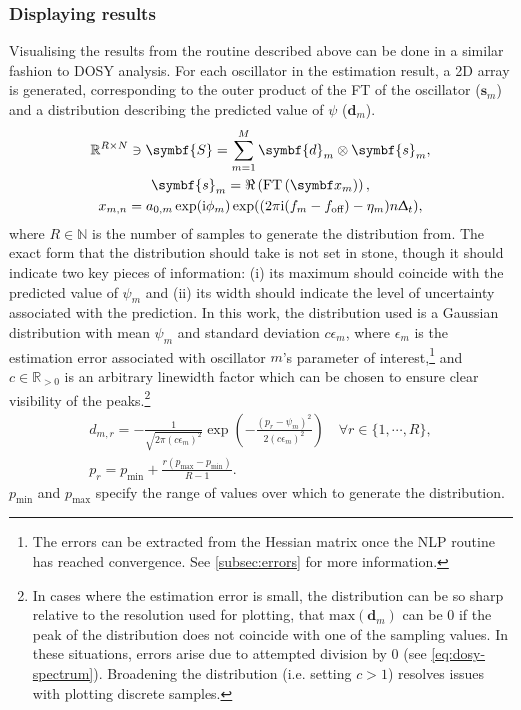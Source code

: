 \subsubsection{Displaying results}
Visualising the results from the routine described above can be done in a
similar fashion to \ac{DOSY} analysis. For each oscillator in the estimation
result, a \ac{2D} array is generated, corresponding to the outer product of the
\ac{FT} of the oscillator ($\symbf{s}_m$) and a distribution describing the
predicted value of $\psi$ ($\symbf{d}_m$).
\begin{subequations}
    \begin{gather}
        \mathbb{R}^{R \times N} \ni \symbf{S} = \sum_{m=1}^{M}
        \symbf{d}_m \otimes
        \symbf{s}_m ,\label{eq:dosy-spectrum}\\
        \symbf{s}_m = \Re\left(\FT\left(\bx_m\right)\right),\\
        x_{m,n} = a_{0,m} \exp(\iu \phi_m)
        \exp((2 \pi \iu (f_m - \foff) - \eta_m ) n \Dt),
    \end{gather}
    \label{eq:dosy-cross-product}
\end{subequations}
where $R \in \mathbb{N}$ is the number of samples to generate the distribution from.
The exact form that the distribution should take is not set in stone, though it
should indicate two key pieces of information:
(i) its maximum should coincide with the predicted value of $\psi_m$ and (ii) its
width should indicate the level of uncertainty associated with the prediction.
In this work, the
distribution used is a Gaussian distribution with mean $\psi_m$ and standard
deviation $c \epsilon_m$, where $\epsilon_m$ is the estimation error associated
with oscillator $m$'s parameter of interest,\footnote{
    The errors can be extracted from the Hessian matrix once the \ac{NLP}
    routine has reached convergence. See \cref{subsec:errors} for more
    information.
}
and $c \in \mathbb{R}_{>0}$ is an arbitrary linewidth factor which can be chosen
to ensure clear visibility of the peaks.\footnote{
    In cases where the estimation error is small, the distribution can be
    so sharp relative to the resolution used for plotting, that
    $\text{max}(\symbf{d}_m)$ can be $0$ if the peak of the distribution does
    not coincide with one of the sampling values. In these situations, errors
    arise due to attempted division by $0$ (see \cref{eq:dosy-spectrum}).
    Broadening the distribution (i.e. setting $c > 1$) resolves issues with
    plotting discrete samples.
}
\begin{subequations}
    \begin{gather}
        d_{m,r} = -\frac{1}{\sqrt{2 \pi (c \epsilon_m)^2}}
        \exp\left(
            - \frac{(p_r - \psi_m)^2}{2 (c \epsilon_m)^2}
        \right)\quad \forall r \in \lbrace 1, \cdots, R \rbrace,\\
        p_r = p_{\text{min}} + \frac{r (p_{\text{max}} - p_{\text{min}})}{R-1}.
    \end{gather}
    \label{eq:distribution}
\end{subequations}
$p_{\text{min}}$ and $p_{\text{max}}$ specify the range of values over which to
generate the distribution.

